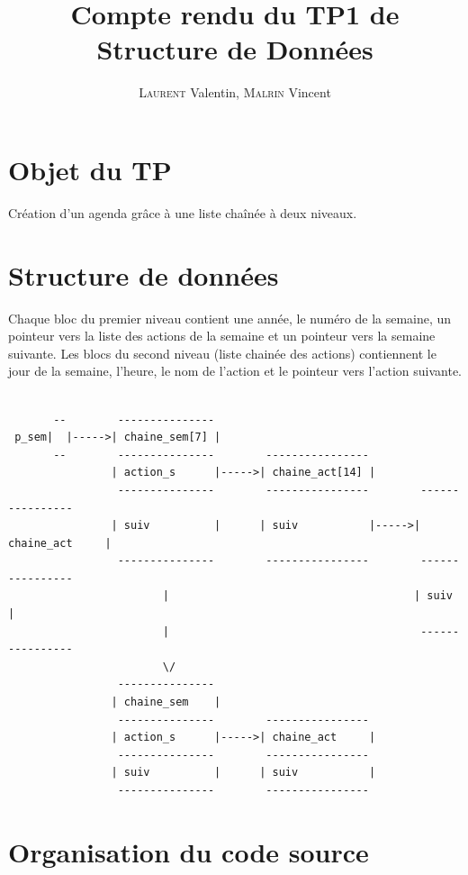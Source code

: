 \documentclass{report}
\title{Compte rendu du TP1 de Structure de Données}
\author{\textsc{Laurent} Valentin, \textsc{Malrin} Vincent}
\begin{document}
\maketitle

\tableofcontents

\setcounter{chapter}{1}
\newpage
\section{Objet du TP}\label{objet}
Création d'un agenda grâce à une liste chaînée à deux niveaux.

\section{Structure de données}\label{sdd}
Chaque bloc du premier niveau contient une année,
le numéro de la semaine, un pointeur vers la liste des actions de la semaine et un pointeur vers la semaine suivante.
Les blocs du second niveau (liste chainée des actions) contiennent le jour de la semaine, l'heure, 
le nom de l'action et le pointeur vers l'action suivante.

\begin{small}
\begin{verbatim}

       --        ---------------
 p_sem|  |----->| chaine_sem[7] |
       --        ---------------        ----------------
                | action_s      |----->| chaine_act[14] |
                 ---------------        ----------------        ----------------
                | suiv          |      | suiv           |----->| chaine_act     |
                 ---------------        ----------------        ----------------
                        |                                      | suiv           |
                        |                                       ----------------
                        \/
                 ---------------
                | chaine_sem    |
                 ---------------        ----------------
                | action_s      |----->| chaine_act     |
                 ---------------        ----------------
                | suiv          |      | suiv           |
                 ---------------        ----------------

\end{verbatim}
\end{small}

\newpage
\section{Organisation du code source}\label{source}
\end{document}
